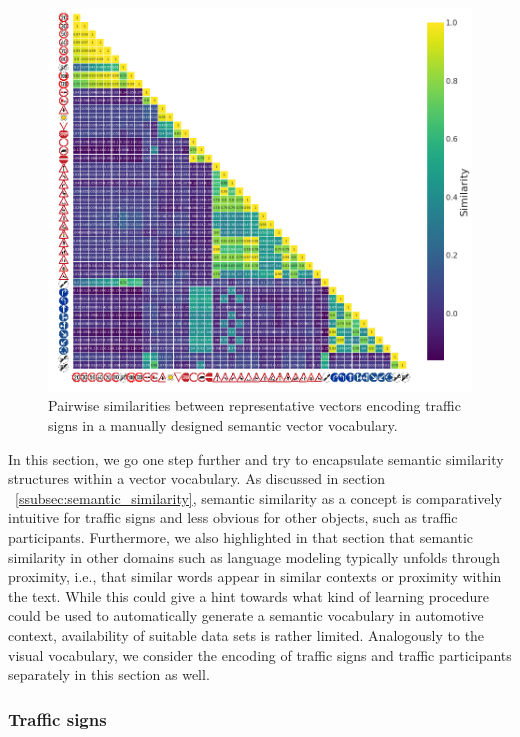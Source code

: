 \begin{figure}[t]
    \centering
    \includegraphics[width=0.8\linewidth]{imgs/semantic_vocab_traffic_signs_internal_similarities.png}
    \caption{Pairwise similarities between representative vectors encoding traffic signs in a manually designed semantic vector vocabulary.}
    \label{fig:semantic_vocab_traffic_signs_internal_similarities}
\end{figure}
In this section, we go one step further and try to encapsulate semantic similarity structures within a vector vocabulary.
As discussed in section ~\ref{ssubsec:semantic_similarity}, semantic similarity as a concept is comparatively intuitive for traffic signs and less obvious for other objects, such as traffic participants.
Furthermore, we also highlighted in that section that semantic similarity in other domains such as language modeling typically unfolds through proximity, i.e., that similar words appear in similar contexts or proximity within the text.
While this could give a hint towards what kind of learning procedure could be used to automatically generate a semantic vocabulary in automotive context, availability of suitable data sets is rather limited.
Analogously to the visual vocabulary, we consider the encoding of traffic signs and traffic participants separately in this section as well. 

\subsubsection{Traffic signs}%
\label{ssubsec:traffic_signs}

